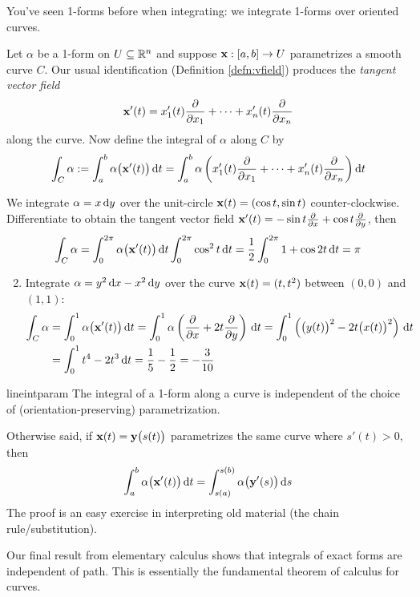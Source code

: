 You've seen 1-forms before when integrating: we integrate 1-forms over oriented curves.

\begin{defn}{}{}
	Let $\alpha$ be a 1-form on $U\subseteq\mathbb{R}^n$ and suppose ${\mathbf{x}}:[a,b]\to U$ parametrizes a smooth curve $C$. Our usual identification (Definition \ref{defn:vfield}) produces the \emph{tangent vector field}
	\[
		{\mathbf{x}}'(t)=x_1'(t)\frac{\partial }{\partial x_1}+\cdots +x_n'(t)\frac{\partial }{\partial x_n}
	\]
	along the curve. Now define the integral of $\alpha$ along $C$ by
	\[
		\int_{C}\alpha:= \int_a^b\alpha\bigl({\mathbf{x}}'(t)\bigr)\,{\mathrm{d} t}= \int_a^b\alpha\left(x_1'(t)\frac{\partial }{\partial x_1}+\cdots +x_n'(t)\frac{\partial }{\partial x_n}\right){\mathrm{d} t}
	\]
\end{defn}


\begin{examples}{}{}
	\exstart We integrate $\alpha=x\,{\mathrm{d} y}$ over the unit-circle ${\mathbf{x}}(t)=(\cos t,\sin t)$ counter-clockwise. Differentiate to obtain the tangent vector field ${\mathbf{x}}'(t)=-\sin t\frac{\partial }{\partial x}+\cos t\frac{\partial }{\partial y}$, then
	\[
		\int_{C}\alpha=\int_0^{2\pi}\alpha\bigl({\mathbf{x}}'(t)\bigr)\,{\mathrm{d} t} \int_0^{2\pi}\cos^2t\,{\mathrm{d} t} =\frac 12\int_0^{2\pi}1+\cos 2t\,{\mathrm{d} t}=\pi
	\]
	\begin{enumerate}\setcounter{enumi}{1}
		\item Integrate $\alpha=y^2\,{\mathrm{d} x}-x^2\,{\mathrm{d} y}$ over the curve ${\mathbf{x}}(t)=(t,t^2)$ between $(0,0)$ and $(1,1)$:
		\begin{align*}
			\int_{C}\alpha&=\int_0^1\alpha\bigl({\mathbf{x}}'(t)\bigr)\,{\mathrm{d} t} = \int_0^1\alpha\left(\frac{\partial }{\partial x}+2t\frac{\partial }{\partial y}\right)\,{\mathrm{d} t} =\int_0^1\left(\bigl(y(t)\bigr)^2-2t\bigl(x(t)\bigr)^2\right)\,{\mathrm{d} t}\\
			&=\int_0^1t^4-2t^3\,{\mathrm{d} t}=\frac 15-\frac 12=-\frac 3{10}
		\end{align*}
	\end{enumerate}
\end{examples}

\begin{lemm}{}{lineintparam}
	The integral of a 1-form along a curve is independent of the choice of (orientation-preserving) parametrization.
\end{lemm}

Otherwise said, if ${\mathbf{x}}(t)={\mathbf{y}}\bigl(s(t)\bigr)$ parametrizes the same curve where $s'(t)>0$, then
\[
	\int_a^b\alpha\bigl({\mathbf{x}}'(t)\bigr)\,{\mathrm{d} t}=\int_{s(a)}^{s(b)}\alpha\bigl({\mathbf{y}}'(s)\bigr)\,{\mathrm{d} s}
\]
The proof is an easy exercise in interpreting old material (the chain rule/substitution).\smallbreak

Our final result from elementary calculus shows that integrals of exact forms are independent of path. This is essentially the fundamental theorem of calculus for curves.

